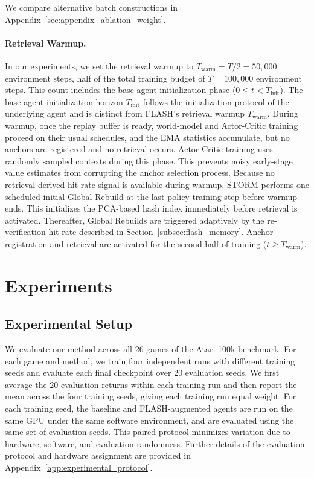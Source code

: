 \documentclass{article} %
\begin{document}
We compare alternative batch constructions in Appendix~\ref{sec:appendix_ablation_weight}.

\paragraph{Retrieval Warmup.}
In our experiments, we set the retrieval warmup to $T_{\text{warm}} = T/2 = 50,000$ environment steps, half of the total training budget of $T = 100,000$ environment steps. This count includes the base-agent initialization phase ($0 \leq t < T_{\text{init}}$). The base-agent initialization horizon $T_{\text{init}}$ follows the initialization protocol of the underlying agent and is distinct from FLASH's retrieval warmup $T_{\text{warm}}$. During warmup, once the replay buffer is ready, world-model and Actor-Critic training proceed on their usual schedules, and the EMA statistics accumulate, but no anchors are registered and no retrieval occurs. Actor-Critic training uses randomly sampled contexts during this phase. This prevents noisy early-stage value estimates from corrupting the anchor selection process. Because no retrieval-derived hit-rate signal is available during warmup, STORM performs one scheduled initial Global Rebuild at the last policy-training step before warmup ends. This initializes the PCA-based hash index immediately before retrieval is activated. Thereafter, Global Rebuilds are triggered adaptively by the re-verification hit rate described in Section~\ref{subsec:flash_memory}. Anchor registration and retrieval are activated for the second half of training ($t \geq T_{\text{warm}}$).


\section{Experiments}
\label{sec:experiments}

\subsection{Experimental Setup}
We evaluate our method across all 26 games of the Atari 100k benchmark. For each game and method, we train four independent runs with different training seeds and evaluate each final checkpoint over 20 evaluation seeds. We first average the 20 evaluation returns within each training run and then report the mean across the four training seeds, giving each training run equal weight. For each training seed, the baseline and FLASH-augmented agents are run on the same GPU under the same software environment, and are evaluated using the same set of evaluation seeds. This paired protocol minimizes variation due to hardware, software, and evaluation randomness. Further details of the evaluation protocol and hardware assignment are provided in Appendix~\ref{app:experimental_protocol}.
\end{document}
